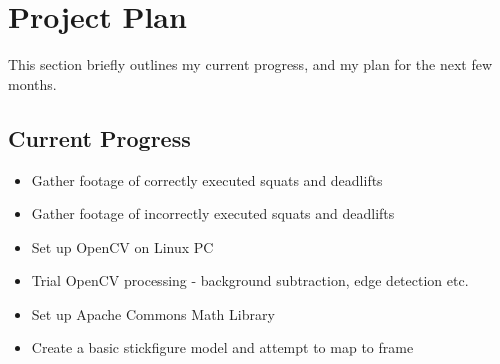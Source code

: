 \section{Project Plan}

This section briefly outlines my current progress, and my plan for the next few months.

\subsection{Current Progress}

\begin{itemize}
	\item Gather footage of correctly executed squats and deadlifts
	\item Gather footage of incorrectly executed squats and deadlifts
	\item Set up OpenCV on Linux PC
	\item Trial OpenCV processing - background subtraction, edge detection etc.
	\item Set up Apache Commons Math Library
	\item Create a basic stickfigure model and attempt to map to frame
\end{itemize}

